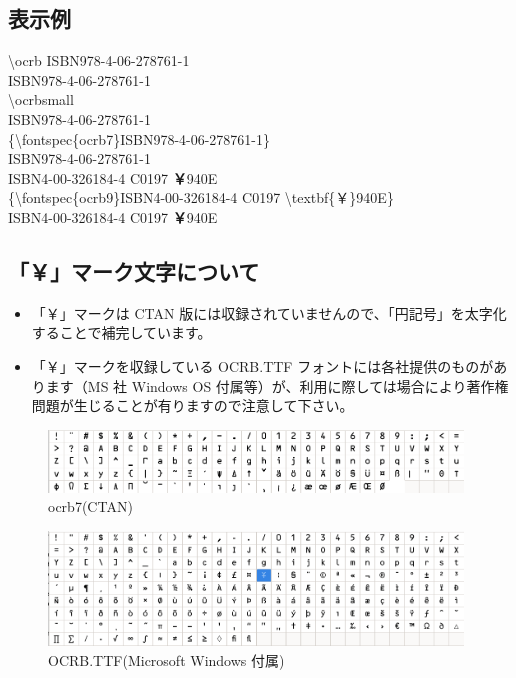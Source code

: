 \documentclass[a5j,tombo,10pt,titlepage,pdfusetitle]{ltjsbook}
\def\ocrb#1{\fontspec{ocrb7} {#1}}
\def\ocrbsmall#1{\fontspec{ocrb7} \fontsize{7}{7}{#1}\selectfont }
\def\fs#1#2{\fontsize{#1}{#2}\selectfont }
\begin{document}
{\subsection{表示例}\vspace{-2mm}

\noindent\quad\textbackslash ocrb ISBN978-4-06-278761-1\\
{\ocrb\quad ISBN978-4-06-278761-1}\\
\quad\textbackslash ocrbsmall\\
{\ocrbsmall\quad ISBN978-4-06-278761-1}\vspace{-6mm}\\

\noindent \{\textbackslash fontspec\{ocrb7\}ISBN978-4-06-278761-1\}\\
{ISBN978-4-06-278761-1}\\
{ISBN4-00-326184-4 C0197 \textbf{￥}940E}\\
\noindent \{\textbackslash fontspec\{ocrb9\}ISBN4-00-326184-4 C0197 \textbackslash textbf\{￥\}940E\}\\
{ISBN4-00-326184-4 C0197 \textbf{￥}940E}\\

\subsection{「￥」マーク文字について}\vspace{-2mm}
{\fs{9}{9}\begin{itemize}
  \item 「￥」マークは CTAN 版には収録されていませんので、「円記号」を太字化することで補完しています。
  \item 「￥」マークを収録している OCRB.TTF フォントには各社提供のものがあります（MS 社 Windows OS 付属等）が、利用に際しては場合により著作権問題が生じることが有りますので注意して下さい。

\end{itemize}
}

\begin{figure}[H]
\centering
\includegraphics[width=11cm]{./images/ocrb-ttf01.png}
\caption{ocrb7(CTAN)} 
\end{figure}
\begin{figure}[H]
\centering
\includegraphics[width=11cm]{./images/ocrb-ttf-ms2.png}
\caption{OCRB.TTF(Microsoft Windows 付属)} 
\end{figure}

}
\end{document}
